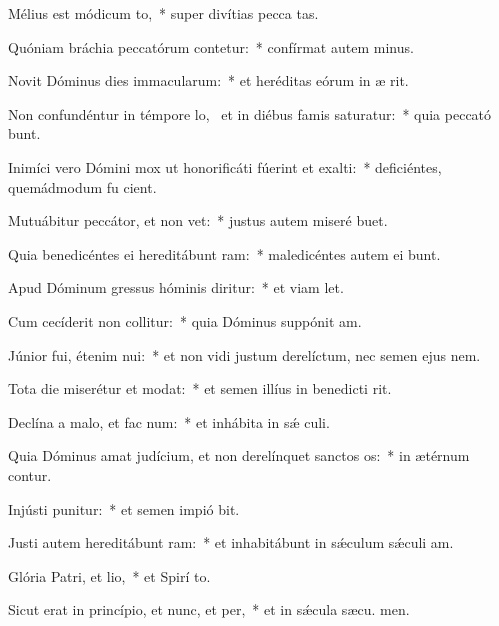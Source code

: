 \item Mélius est módicum to,~* super divítias pecca tas.
\item Quóniam bráchia peccatórum contetur:~* confírmat autem  minus.
\item Novit Dóminus dies immacularum:~* et heréditas eórum in æ rit.
\item Non confundéntur in témpore lo,~\pscross{} et in diébus famis saturatur:~* quia peccató bunt.
\item Inimíci vero Dómini mox ut honorificáti fúerint et exalti:~* deficiéntes, quemádmodum fu cient.
\item Mutuábitur peccátor, et non vet:~* justus autem miseré  buet.
\item Quia benedicéntes ei hereditábunt ram:~* maledicéntes autem ei bunt.
\item Apud Dóminum gressus hóminis diritur:~* et viam  let.
\item Cum cecíderit non collitur:~* quia Dóminus suppónit  am.
\item Júnior fui, étenim nui:~* et non vidi justum derelíctum, nec semen ejus  nem.
\item Tota die miserétur et modat:~* et semen illíus in benedicti rit.
\item Declína a malo, et fac num:~* et inhábita in sǽ culi.
\item Quia Dóminus amat judícium, et non derelínquet sanctos os:~* in ætérnum contur.
\item Injústi punitur:~* et semen impió bit.
\item Justi autem hereditábunt ram:~* et inhabitábunt in sǽculum sǽculi  am.
\item Glória Patri, et lio,~* et Spirí to.
\item Sicut erat in princípio, et nunc, et per,~* et in sǽcula sæcu. men.
